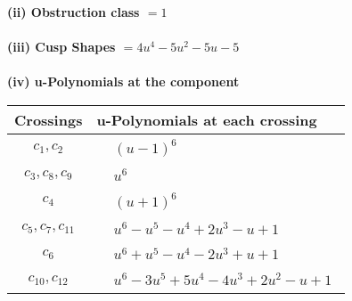 \documentclass[1p]{elsarticle_modified}
\theoremstyle{definition}
\begin{document}
\flushleft \textbf{(ii) Obstruction class $= 1$}\\~\\
\flushleft \textbf{(iii) Cusp Shapes $= 4 u^4-5 u^2-5 u-5$}\\~\\
\newpage\renewcommand{\arraystretch}{1}
\flushleft \textbf{(iv) u-Polynomials at the component}\newline \\
\begin{tabular}{m{50pt}|m{274pt}}
Crossings & \hspace{64pt}u-Polynomials at each crossing \\
\hline $$\begin{aligned}c_{1},c_{2}\end{aligned}$$&$\begin{aligned}
&(u-1)^6
\end{aligned}$\\
\hline $$\begin{aligned}c_{3},c_{8},c_{9}\end{aligned}$$&$\begin{aligned}
&u^6
\end{aligned}$\\
\hline $$\begin{aligned}c_{4}\end{aligned}$$&$\begin{aligned}
&(u+1)^6
\end{aligned}$\\
\hline $$\begin{aligned}c_{5},c_{7},c_{11}\end{aligned}$$&$\begin{aligned}
&u^6- u^5- u^4+2 u^3- u+1
\end{aligned}$\\
\hline $$\begin{aligned}c_{6}\end{aligned}$$&$\begin{aligned}
&u^6+u^5- u^4-2 u^3+u+1
\end{aligned}$\\
\hline $$\begin{aligned}c_{10},c_{12}\end{aligned}$$&$\begin{aligned}
&u^6-3 u^5+5 u^4-4 u^3+2 u^2- u+1
\end{aligned}$\\
\hline
\end{tabular}\\~\\
\end{document}
